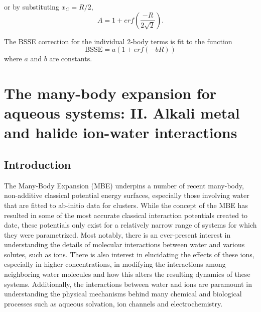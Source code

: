 \documentclass[11pt, proquest]{uwthesis}[2020/02/24]
\begin{document}
or by substituting $x_C=R/2$,
\begin{equation}\label{eq:MBE_I_1}
    A=1+erf\left(\frac{-R}{2\sqrt{2}}\right).
\end{equation}

The BSSE correction for the individual 2-body terms is fit to the function
\begin{equation}\label{eq:MBE_I_2}
    \mathrm{BSSE}=a(1+erf(-bR))
\end{equation}
where $a$ and $b$ are constants.


\chapter{The many-body expansion for aqueous systems: II. Alkali metal and halide ion-water interactions}
\label{ch:MBE_II}

\section{Introduction}
\par The Many-Body Expansion (MBE) underpins a number of recent many-body, non-additive classical potential energy surfaces, especially those involving water\autocite{burnham_development_2002,fanourgakis_flexible_2006,fanourgakis_development_2008,heindel_benchmark_2018,wang_flexible_2011,babin_development_2013,das_development_2019,gora_predictions_2014} that are fitted to ab-initio data for clusters. While the concept of the MBE has resulted in some of the most accurate classical interaction potentials created to date, these potentials only exist for a relatively narrow range of systems for which they were parametrized. Most notably, there is an ever-present interest in understanding the details of molecular interactions between water and various solutes, such as ions. There is also interest in elucidating the effects of these ions, especially in higher concentrations, in modifying the interactions among neighboring water molecules and how this alters the resulting dynamics of these systems. Additionally, the interactions between water and ions are paramount in understanding the physical mechanisms behind many chemical and biological processes such as aqueous solvation\autocite{makarov_solvation_2002,collins_ions_2004}, ion channels\autocite{pinto_influenza_1992,shearman_modulation_1989} and electrochemistry.\autocite{zhang_effects_2011,liu_doping_2006,tang_dynamic_2011}
\end{document}
